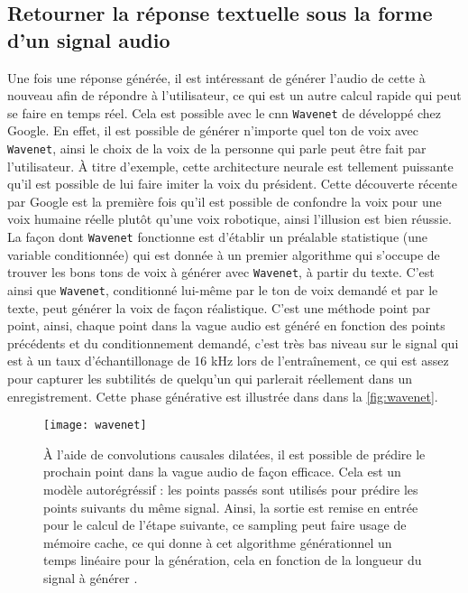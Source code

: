 \subsection{Retourner la réponse textuelle sous la forme d'un signal audio}
Une fois une réponse générée, il est intéressant de générer l’audio de cette à nouveau afin de répondre à l’utilisateur, ce qui est un autre calcul rapide qui peut se faire en temps réel. Cela est possible avec le \gls{cnn} \texttt{Wavenet} de \cite{wavenet} développé chez Google. En effet, il est possible de générer n’importe quel ton de voix avec \texttt{Wavenet}, ainsi le choix de la voix de la personne qui parle peut être fait par l’utilisateur. À titre d’exemple, cette architecture neurale est tellement puissante qu’il est possible de lui faire imiter la voix du président. Cette découverte récente par Google est la première fois qu’il est possible de confondre la voix pour une voix humaine réelle plutôt qu’une voix robotique, ainsi l’illusion est bien réussie. La façon dont \texttt{Wavenet} fonctionne est d’établir un préalable statistique (une variable conditionnée) qui est donnée à un premier algorithme qui s’occupe de trouver les bons tons de voix à générer avec \texttt{Wavenet}, à partir du texte. C’est ainsi que \texttt{Wavenet}, conditionné lui-même par le ton de voix demandé et par le texte, peut générer la voix de façon réalistique. C’est une méthode point par point, ainsi, chaque point dans la vague audio est généré en fonction des points précédents et du conditionnement demandé, c’est très bas niveau sur le signal qui est à un taux d’échantillonage de 16 kHz lors de l’entraînement, ce qui est assez pour capturer les subtilités de quelqu’un qui parlerait réellement dans un enregistrement. Cette phase générative est illustrée dans dans la \autoref{fig:wavenet}.

\begin{figure*}
  \centering
  \texttt{[image: wavenet]}
  \caption{À l’aide de convolutions causales dilatées, il est possible de prédire le prochain point dans la vague audio de façon efficace. Cela est un modèle autorégréssif : les points passés sont utilisés pour prédire les points suivants du même signal. Ainsi, la sortie est remise en entrée pour le calcul de l’étape suivante, ce sampling peut faire usage de mémoire cache, ce qui donne à cet algorithme générationnel un temps linéaire pour la génération, cela en fonction de la longueur du signal à générer \cite{wavenet}.}
  \label{fig:wavenet}
\end{figure*}
